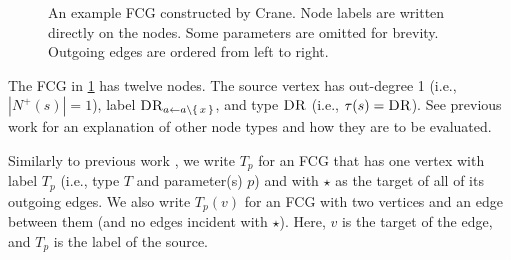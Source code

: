\begin{figure}[t]
  \centering
  \caption{An example FCG constructed by Crane. Node labels are written directly on the nodes. Some parameters are omitted for brevity. Outgoing edges are ordered from left to right.}
  \label{fig:examplefcg}
\end{figure}

\begin{example}
The FCG in \cref{fig:examplefcg} has twelve nodes. The source vertex has out-degree 1 (i.e., $|N^+(s)| = 1$), label $\operatorname{\textsc{DR}}_{a \gets a \setminus \{\, x \,\}}$, and type $\operatorname{\textsc{DR}}$ (i.e., $\tau(s) = \operatorname{\textsc{DR}}$). See previous work \citep{DBLP:conf/ijcai/BroeckTMDR11} for an explanation of other node types and how they are to be evaluated. 
\end{example}


Similarly to previous work \citep{DBLP:conf/ijcai/BroeckTMDR11}, we write $T_p$ for an FCG that has one vertex with label $T_p$ (i.e., type $T$ and parameter(s) $p$) and with $\star$ as the target of all of its outgoing edges. We also write $T_p(v)$ for an FCG with two vertices and an edge between them (and no edges incident with $\star$). Here, $v$ is the target of the edge, and $T_p$ is the label of the source.

